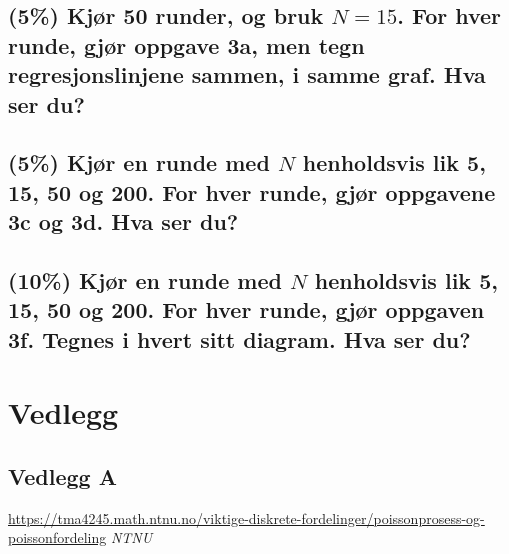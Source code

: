 \documentclass[12pt]{article}
\begin{document}
\subsection{(5\%) Kjør 50 runder, og bruk $N = 15$. For hver runde, gjør oppgave 3a, men tegn regresjonslinjene sammen, i samme graf. Hva ser du?}
\subsection{(5\%) Kjør en runde med $N$ henholdsvis lik 5, 15, 50 og 200. For hver runde, gjør oppgavene 3c og 3d. Hva ser du?}
\subsection{(10\%) Kjør en runde med $N$ henholdsvis lik 5, 15, 50 og 200. For hver runde, gjør oppgaven 3f. Tegnes i hvert sitt diagram. Hva ser du?}

\newpage
\section*{Vedlegg}
\subsection*{Vedlegg A}

\newpage
\begin{thebibliography}{9}

  \url{https://tma4245.math.ntnu.no/viktige-diskrete-fordelinger/poissonprosess-og-poissonfordeling}
  \textit{NTNU}
\end{thebibliography}
\end{document}
